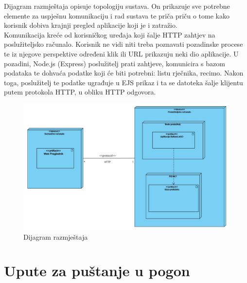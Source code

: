 		Dijagram razmještaja opisuje topologiju sustava. On prikazuje sve potrebne elemente za uspješnu komunikaciju i rad sustava te priča priču o tome kako korisnik dobiva krajnji pregled aplikacije koji je i zatražio. 
		\newline
		\\
		Komunikacija kreće od korisničkog uređaja koji šalje HTTP zahtjev na poslužiteljsko računalo. Korisnik ne vidi niti treba poznavati pozadinske procese te iz njegove perspektive određeni klik ili URL prikazuju neki dio aplikacije. U pozadini, Node.js (Express) poslužitelj prati zahtjeve, komunicira s bazom podataka te dohvaća podatke koji će biti potrebni: listu rječnika, recimo. Nakon toga, poslužitelj te podatke ugrađuje u EJS prikaz i ta se datoteka šalje klijentu putem protokola HTTP, u obliku HTTP odgovora.
			\begin{figure}[h]
				\centering
				\includegraphics[width=1.1\textwidth]{dijagrami/DijagamRazmjestaja.jpg}
				\caption{Dijagram razmještaja}
				\label{fig:dijagram_razmjestaja}
			\end{figure}	

			\eject 
		
		\section{Upute za puštanje u pogon}
		
